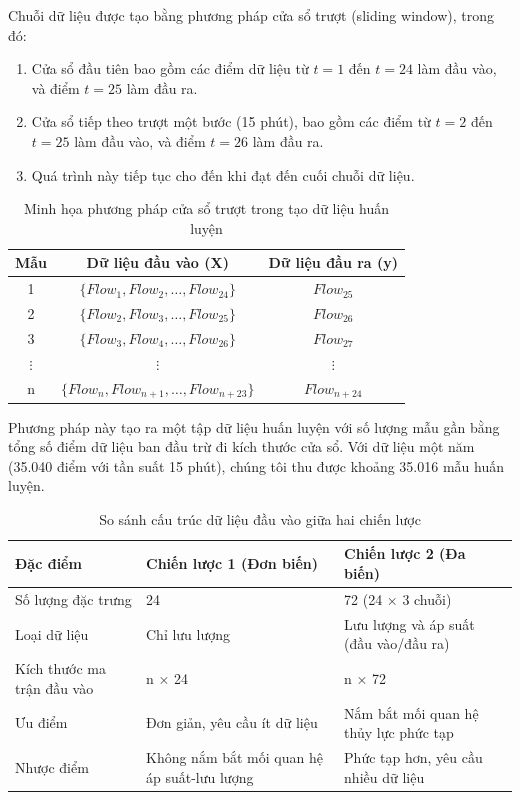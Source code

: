 Chuỗi dữ liệu được tạo bằng phương pháp cửa sổ trượt (sliding window), trong đó:

\begin{enumerate}
    \item Cửa sổ đầu tiên bao gồm các điểm dữ liệu từ $t=1$ đến $t=24$ làm đầu vào, và điểm $t=25$ làm đầu ra.
    \item Cửa sổ tiếp theo trượt một bước (15 phút), bao gồm các điểm từ $t=2$ đến $t=25$ làm đầu vào, và điểm $t=26$ làm đầu ra.
    \item Quá trình này tiếp tục cho đến khi đạt đến cuối chuỗi dữ liệu.
\end{enumerate}

\begin{table}[h]
    \centering
    \begin{tabular}{|c|c|c|}
        \hline
        \textbf{Mẫu} & \textbf{Dữ liệu đầu vào (X)} & \textbf{Dữ liệu đầu ra (y)} \\
        \hline
        1 & $\{Flow_1, Flow_2, \ldots, Flow_{24}\}$ & $Flow_{25}$ \\
        \hline
        2 & $\{Flow_2, Flow_3, \ldots, Flow_{25}\}$ & $Flow_{26}$ \\
        \hline
        3 & $\{Flow_3, Flow_4, \ldots, Flow_{26}\}$ & $Flow_{27}$ \\
        \hline
        $\vdots$ & $\vdots$ & $\vdots$ \\
        \hline
        n & $\{Flow_{n}, Flow_{n+1}, \ldots, Flow_{n+23}\}$ & $Flow_{n+24}$ \\
        \hline
    \end{tabular}
    \caption{Minh họa phương pháp cửa sổ trượt trong tạo dữ liệu huấn luyện}
    \label{tab:sliding_window_example}
\end{table}

Phương pháp này tạo ra một tập dữ liệu huấn luyện với số lượng mẫu gần bằng tổng số điểm dữ liệu ban đầu trừ đi kích thước cửa sổ. Với dữ liệu một năm (35.040 điểm với tần suất 15 phút), chúng tôi thu được khoảng 35.016 mẫu huấn luyện.

\begin{table}[h]
    \centering
    \begin{tabular}{|p{3cm}|p{5cm}|p{5cm}|}
        \hline
        \textbf{Đặc điểm} & \textbf{Chiến lược 1 (Đơn biến)} & \textbf{Chiến lược 2 (Đa biến)} \\
        \hline
        Số lượng đặc trưng & 24 & 72 (24 × 3 chuỗi) \\
        \hline
        Loại dữ liệu & Chỉ lưu lượng & Lưu lượng và áp suất (đầu vào/đầu ra) \\
        \hline
        Kích thước ma trận đầu vào & n × 24 & n × 72 \\
        \hline
        Ưu điểm & Đơn giản, yêu cầu ít dữ liệu & Nắm bắt mối quan hệ thủy lực phức tạp \\
        \hline
        Nhược điểm & Không nắm bắt mối quan hệ áp suất-lưu lượng & Phức tạp hơn, yêu cầu nhiều dữ liệu \\
        \hline
    \end{tabular}
    \caption{So sánh cấu trúc dữ liệu đầu vào giữa hai chiến lược}
    \label{tab:strategy_input_comparison}
\end{table}


